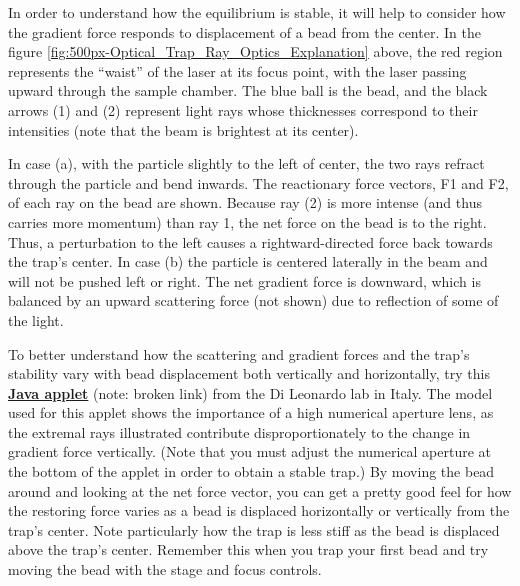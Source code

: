 \documentclass{../lab}
\begin{document}
In order to understand how the equilibrium is stable, it will help to consider how the gradient force responds to displacement of a bead from the center. In the figure \ref{fig:500px-Optical_Trap_Ray_Optics_Explanation} above, the red region represents the ``waist'' of the laser at its focus point, with the laser passing upward through the sample chamber. The blue ball is the bead, and the black arrows (1) and (2) represent light rays whose thicknesses correspond to their intensities (note that the beam is brightest at its center).

\newpage

In case (a), with the particle slightly to the left of center, the two rays refract through the particle and bend inwards. The reactionary force vectors, F1 and F2, of each ray on the bead are shown. Because ray (2) is more intense (and thus carries more momentum) than ray 1, the net force on the bead is to the right. Thus, a perturbation to the left causes a rightward-directed force back towards the trap's center. In case (b) the particle is centered laterally in the beam and will not be pushed left or right. The net gradient force is downward, which is balanced by an upward scattering force (not shown) due to reflection of some of the light.

To better understand how the scattering and gradient forces and the trap's stability vary with bead displacement both vertically and horizontally, try this \href{http://glass.phys.uniroma1.it/dileonardo/content/apps/trapforces.php}{\textbf{Java applet}} (note: broken link) from the Di Leonardo lab \cite{Leonardo} in Italy. The model used for this applet shows the importance of a high numerical aperture lens, as the extremal rays illustrated contribute disproportionately to the change in gradient force vertically. (Note that you must adjust the numerical aperture at the bottom of the applet in order to obtain a stable trap.) By moving the bead around and looking at the net force vector, you can get a pretty good feel for how the restoring force varies as a bead is displaced horizontally or vertically from the trap's center. Note particularly how the trap is less stiff as the bead is displaced above the trap's center. Remember this when you trap your first bead and try moving the bead with the stage and focus controls.
\end{document}
